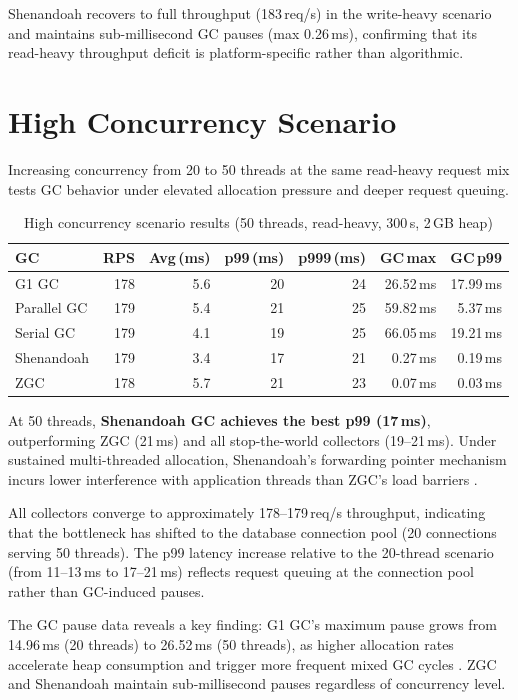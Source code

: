 Shenandoah recovers to full throughput (183\,req/s) in the write-heavy scenario and maintains sub-millisecond GC pauses (max 0.26\,ms), confirming that its read-heavy throughput deficit is platform-specific rather than algorithmic.

\section{High Concurrency Scenario}
\label{sec:results-hc}

Increasing concurrency from 20 to 50 threads at the same read-heavy request mix tests GC behavior under elevated allocation pressure and deeper request queuing.

\begin{table}[htbp]
\centering
\caption{High concurrency scenario results (50 threads, read-heavy, 300\,s, 2\,GB heap)}
\label{tab:results-hc}
\begin{tabular}{lrrrrrr}
\hline
\textbf{GC} & \textbf{RPS} & \textbf{Avg\,(ms)} & \textbf{p99\,(ms)} & \textbf{p999\,(ms)} & \textbf{GC\,max} & \textbf{GC\,p99} \\
\hline
G1 GC       & 178 & 5.6 & 20 & 24 & 26.52\,ms & 17.99\,ms \\
Parallel GC & 179 & 5.4 & 21 & 25 & 59.82\,ms &  5.37\,ms \\
Serial GC   & 179 & 4.1 & 19 & 25 & 66.05\,ms & 19.21\,ms \\
Shenandoah  & 179 & 3.4 & 17 & 21 &  0.27\,ms &  0.19\,ms \\
ZGC         & 178 & 5.7 & 21 & 23 &  0.07\,ms &  0.03\,ms \\
\hline
\end{tabular}
\end{table}

At 50 threads, \textbf{Shenandoah GC achieves the best p99 (17\,ms)}, outperforming ZGC (21\,ms) and all stop-the-world collectors (19--21\,ms). Under sustained multi-threaded allocation, Shenandoah's forwarding pointer mechanism incurs lower interference with application threads than ZGC's load barriers \cite{flood2016shenandoah}.

All collectors converge to approximately 178--179\,req/s throughput, indicating that the bottleneck has shifted to the database connection pool (20 connections serving 50 threads). The p99 latency increase relative to the 20-thread scenario (from 11--13\,ms to 17--21\,ms) reflects request queuing at the connection pool rather than GC-induced pauses.

The GC pause data reveals a key finding: G1 GC's maximum pause grows from 14.96\,ms (20 threads) to 26.52\,ms (50 threads), as higher allocation rates accelerate heap consumption and trigger more frequent mixed GC cycles \cite{detlefs2004garbage}. ZGC and Shenandoah maintain sub-millisecond pauses regardless of concurrency level.

